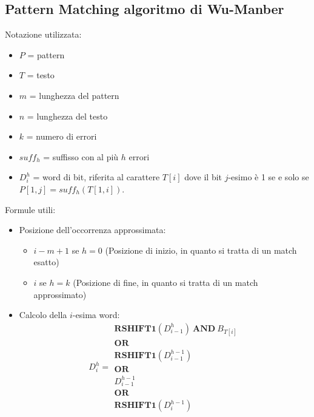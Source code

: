 \subsection{Pattern Matching algoritmo di Wu-Manber}
Notazione utilizzata:
\begin{itemize}
    \item $P$ = pattern
    \item $T$ = testo
    \item $m$ = lunghezza del pattern
    \item $n$ = lunghezza del testo
    \item $k$ = numero di errori
    \item $suff_h$ = suffisso con al più $h$ errori
    \item $D_i^h$ = word di bit, riferita al carattere $T[i]$ dove il bit
          $j$-esimo è 1 se e solo se $P[1, j] = suff_h(T[1, i])$.
\end{itemize}
Formule utili:
\begin{itemize}
    \item Posizione dell'occorrenza approssimata:
          \begin{itemize}
              \item $i - m + 1$ se $h = 0$ (Posizione di inizio, in quanto si
                    tratta di un match esatto)
              \item $i$ se $h = k$  (Posizione di fine, in quanto si tratta di
                    un match approssimato)
          \end{itemize}
    \item Calcolo della $i$-esima word:
          \begin{equation}
              D_i^h = \begin{array}{l}
                  \textbf{RSHIFT1}(D_{i - 1}^h) \ \textbf{AND} \ B_{T[i]} \\
                  \textbf{OR}                                             \\
                  \textbf{RSHIFT1}(D_{i - 1}^{h - 1})                     \\
                  \textbf{OR}                                             \\
                  D_{i - 1}^{h - 1}                                       \\
                  \textbf{OR}                                             \\
                  \textbf{RSHIFT1}(D_{i}^{h - 1})
              \end{array}
          \end{equation}
\end{itemize}